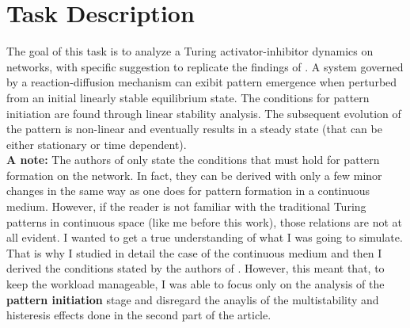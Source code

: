 \section{Task Description}
The goal of this task is to analyze a Turing activator-inhibitor dynamics on networks, with specific suggestion to replicate the findings of \cite{main_network}. 
\noindent
A system governed by a reaction-diffusion mechanism can exibit pattern emergence when perturbed from an initial linearly stable equilibrium state. The conditions for pattern initiation are found through linear stability analysis. The subsequent evolution of the pattern is non-linear and eventually results in a steady state (that can be either stationary or time dependent).
\\
\textbf{A note:} The authors of \cite{main_network} only state the conditions that must hold for pattern formation on the network. In fact, they can be derived with only a few minor changes in the same way as one does for pattern formation in a continuous medium. However, if the reader is not familiar with the traditional Turing patterns in continuous space (like me before this work), those relations are not at all evident. I wanted to get a true understanding of what I was going to simulate. That is why I studied in detail the case of the continuous medium and then I derived the conditions stated by the authors of \cite{main_network}. However, this meant that, to keep the workload manageable, I was able to focus only on the analysis of the \textbf{pattern initiation} stage and disregard the anaylis of the multistability and histeresis effects done in the second part of the article.

